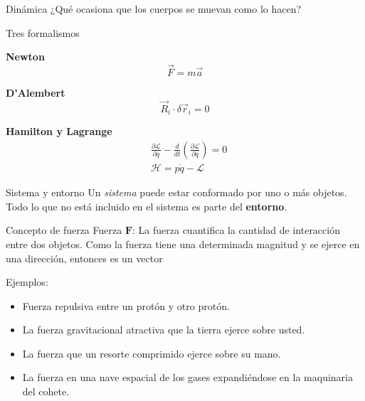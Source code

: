\begin{frame}{Dinámica}
    ¿Qué ocasiona que los cuerpos se muevan como lo hacen?

    Tres formalismos
    \begin{center}
    
        \textbf{Newton}
        \begin{equation*}
            \boxed{\vec{F}=m\vec{a}}
        \end{equation*}

        \textbf{D'Alembert}
        \begin{equation*}
        \vec{R}_i\cdot\delta\vec{r}_i=0
        \end{equation*}
        
        \textbf{Hamilton y Lagrange}
        \begin{align*}
            &\frac{\partial\mathcal{L}}{\partial q}-\frac{d}{dt}\left(\frac{\partial\mathcal{L}}{\partial\dot{q}}\right)=0\\
            &\mathcal{H}=p\dot{q}-\mathcal{L}
        \end{align*}
    \end{center}
        
\end{frame}

\begin{frame}{Sistema y entorno}
    Un \emph{sistema} puede estar conformado por uno o más objetos. Todo lo que no está incluido en el sistema es parte del \textbf{entorno}.
\end{frame}

\begin{frame}{Concepto de fuerza}
    Fuerza $\mathbf{F}$: La fuerza cuantifica la cantidad de interacción entre dos objetos. Como la fuerza tiene una determinada magnitud y se ejerce en una dirección, entonces es un vector

Ejemplos:
\begin{itemize}
\item Fuerza repulsiva entre un protón y otro protón.
\item La fuerza gravitacional atractiva que la tierra ejerce sobre usted.
\item La fuerza que un resorte comprimido ejerce sobre su mano.
\item La fuerza en una nave espacial de los gases expandiéndose en la
  maquinaria del cohete.
\end{itemize}
\end{frame}


